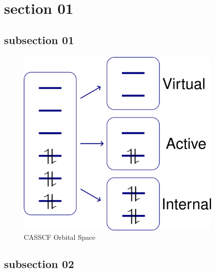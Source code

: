 \documentclass[class=book, crop=false]{standalone}
\begin{document}
\section{section 01}

\subsection{subsection 01}

\paragraph*{}
\blindtext

\paragraph*{}
\blindtext

\begin{figure}[htbp]
    \centering
    \includegraphics[width=10cm]{../../figures_and_plots/figures/casscf.png}
    \caption{CASSCF Orbital Space}
    \label{fig:casscf_orbital_space}
\end{figure}

\subsection{subsection 02}

\paragraph*{}
\Blindtext
\end{document}
